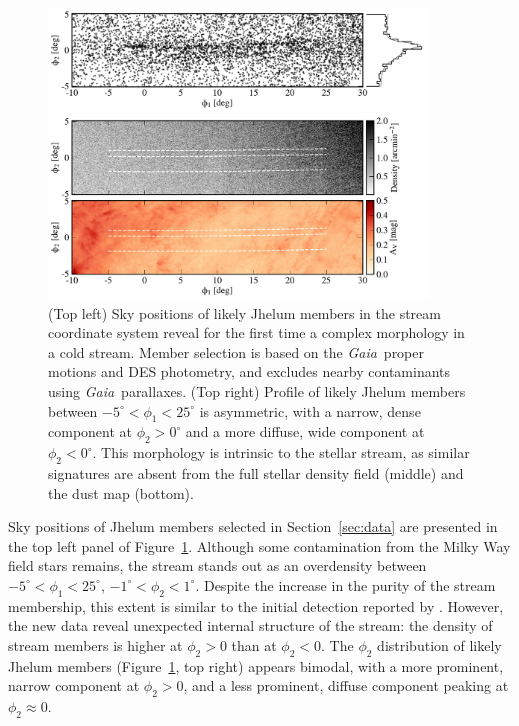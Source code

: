 \documentclass[twocolumn]{aastex62}
\newcommand{\gaia}{\textsl{Gaia}}
\begin{document}
\begin{figure}
\begin{center}
\includegraphics[width=0.9\textwidth]{map.pdf}
\end{center}
\caption{
(Top left) Sky positions of likely Jhelum members in the stream coordinate system reveal for the first time a complex morphology in a cold stream.
Member selection is based on the \gaia\ proper motions and DES photometry, and excludes nearby contaminants using \gaia\ parallaxes.
(Top right) Profile of likely Jhelum members between $-5^\circ<\phi_1<25^\circ$ is asymmetric, with a narrow, dense component at $\phi_2>0^\circ$ and a more diffuse, wide component at $\phi_2<0^\circ$.
This morphology is intrinsic to the stellar stream, as similar signatures are absent from the full stellar density field (middle) and the dust map (bottom).
}
\label{fig:map}
\end{figure}

Sky positions of Jhelum members selected in Section~\ref{sec:data} are presented in the top left panel of Figure~\ref{fig:map}. 
Although some contamination from the Milky Way field stars remains, the stream stands out as an overdensity between $-5^\circ<\phi_1<25^\circ$, $-1^\circ<\phi_2<1^\circ$.
Despite the increase in the purity of the stream membership, this extent is similar to the initial detection reported by \citet{shipp2018}.
However, the new data reveal unexpected internal structure of the stream: the density of stream members is higher at $\phi_2>0$ than at $\phi_2<0$.
The $\phi_2$ distribution of likely Jhelum members (Figure~\ref{fig:map}, top right) appears bimodal, with a more prominent, narrow component at $\phi_2>0$, and a less prominent, diffuse component peaking at $\phi_2\approx0$.
\end{document}
